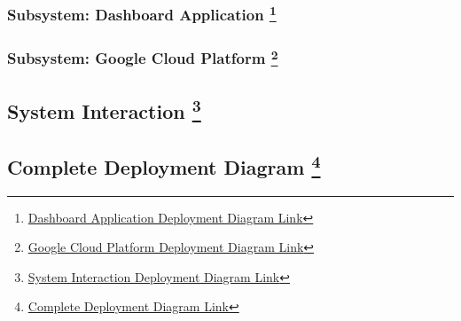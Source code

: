 \documentclass[a4paper, 11pt]{article}
\begin{document}
\subsubsection{Subsystem: Dashboard Application \protect\footnote{\href{https://drive.google.com/file/d/1cdy7gCFvqdG9SnVlOnqN5DdoDpwk0-lt/view?usp=sharing}{Dashboard Application Deployment Diagram Link}}}
\begin{center}
\end{center}
\pagebreak

\subsubsection{Subsystem: Google Cloud Platform \protect\footnote{\href{https://drive.google.com/file/d/1tM2_4mMneOdmi8TXDAAXSIQc-4YGL3kn/view?usp=sharing}{Google Cloud Platform Deployment Diagram Link}}}
\begin{center}
\end{center}
\pagebreak

\subsection{System Interaction \protect\footnote{\href{https://drive.google.com/file/d/1-DyqIscQNzywMus3V3obXGsU3PRfaaA8/view?usp=sharing}{System Interaction Deployment Diagram Link}}}
\begin{center}
\end{center}
\pagebreak

\subsection{Complete Deployment Diagram \protect\footnote{\href{https://drive.google.com/file/d/1LZspojFwhiKx5oFdyUkPz4nYHb89kW6s/view?usp=sharing}{Complete Deployment Diagram Link}}}
\begin{center}
\end{center}
\pagebreak
\end{document}
